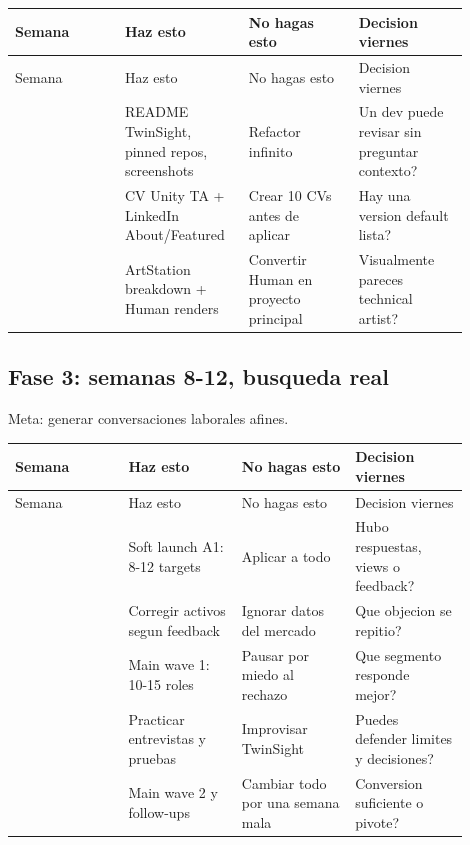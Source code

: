 \begin{center}
\scriptsize
\begin{longtable}{>{\raggedright\arraybackslash}p{0.225\linewidth} >{\raggedright\arraybackslash}p{0.225\linewidth} >{\raggedright\arraybackslash}p{0.225\linewidth} >{\raggedright\arraybackslash}p{0.225\linewidth}}
\toprule
Semana & Haz esto & No hagas esto & Decision viernes \\
\midrule
\endfirsthead
\toprule
Semana & Haz esto & No hagas esto & Decision viernes \\
\midrule
\endhead
5 & README TwinSight, pinned repos, screenshots & Refactor infinito & Un dev puede revisar sin preguntar contexto? \\
6 & CV Unity TA + LinkedIn About/Featured & Crear 10 CVs antes de aplicar & Hay una version default lista? \\
7 & ArtStation breakdown + Human renders & Convertir Human en proyecto principal & Visualmente pareces technical artist? \\
\bottomrule
\end{longtable}
\end{center}



\subsection{Fase 3: semanas 8-12, busqueda real}


Meta: generar conversaciones laborales afines.


\begin{center}
\scriptsize
\begin{longtable}{>{\raggedright\arraybackslash}p{0.225\linewidth} >{\raggedright\arraybackslash}p{0.225\linewidth} >{\raggedright\arraybackslash}p{0.225\linewidth} >{\raggedright\arraybackslash}p{0.225\linewidth}}
\toprule
Semana & Haz esto & No hagas esto & Decision viernes \\
\midrule
\endfirsthead
\toprule
Semana & Haz esto & No hagas esto & Decision viernes \\
\midrule
\endhead
8 & Soft launch A1: 8-12 targets & Aplicar a todo & Hubo respuestas, views o feedback? \\
9 & Corregir activos segun feedback & Ignorar datos del mercado & Que objecion se repitio? \\
10 & Main wave 1: 10-15 roles & Pausar por miedo al rechazo & Que segmento responde mejor? \\
11 & Practicar entrevistas y pruebas & Improvisar TwinSight & Puedes defender limites y decisiones? \\
12 & Main wave 2 y follow-ups & Cambiar todo por una semana mala & Conversion suficiente o pivote? \\
\bottomrule
\end{longtable}
\end{center}



